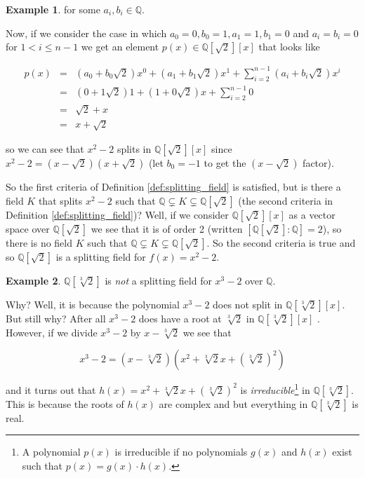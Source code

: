 \documentclass[11pt, oneside]{article}   	%
\theoremstyle{definition}
\newtheorem{example}{Example}[section]
\begin{document}
\begin{example}
\bigskip
\noindent
for some $a_i, b_i \in \mathbb{Q}$.

\bigskip
\noindent
Now, if we consider the case in which $a_0 = 0, b_0 = 1, a_1 = 1, b_1 = 0$ and 
$a_i = b_i = 0$ for $1 < i \leq n - 1$ we get an element $p(x) \in \mathbb{Q}[\sqrt{2}][x]$ 
that looks like

\begin{equation*}
\begin{array}{rlll} 
p(x)   
&=& (a_0 + b_0 \sqrt{2}) x^0 + (a_1 + b_1 \sqrt{2}) x^1 + \sum\limits_{i = 2}^{n-1} (a_i+ b_i \sqrt{2}) x^i    \\    
&=& (0 + 1 \sqrt{2}) 1 + (1 + 0 \sqrt{2}) x + \sum\limits_{i = 2}^{n-1} 0                                   \\    
&=&   \sqrt{2} + x                                                                                                                                      \\
&=&  x +  \sqrt{2}   
\end{array}
\end{equation*}

\bigskip
\noindent
so we can see that $x^2 - 2$ splits in $\mathbb{Q}[\sqrt{2}][x]$  since $x^2 -2 = (x - \sqrt{2})(x + \sqrt{2})$ (let $b_0 = -1$ to get the $(x - \sqrt{2})$ factor).

\bigskip
\noindent
So the first criteria of Definition \ref{def:splitting_field} is satisfied, but is there a field $K$ that splits $x^2 - 2$ such that 
$\mathbb{Q} \subsetneq  K \subsetneq \mathbb{Q}[\sqrt{2}]$ (the second criteria in Definition \ref{def:splitting_field})? Well, if we consider 
$\mathbb{Q}[\sqrt{2}][x]$ as a vector space over $\mathbb{Q}[\sqrt{2}]$ we see that it is of order 2 (written $[\mathbb{Q}[\sqrt{2}]: \mathbb{Q}] = 2$), 
so there is no field $K$ such that $\mathbb{Q} \subsetneq  K \subsetneq \mathbb{Q}[\sqrt{2}]$. So the second criteria is true and so  
$\mathbb{Q}[\sqrt{2}]$ is a splitting field for $f(x) = x^2 - 2$.
\end{example}



\begin{example}
$\mathbb{Q}[\sqrt[3]{2}]$ is \emph{not} a splitting field for $x^3 - 2$ over $\mathbb{Q}$. 

\bigskip
\noindent
Why? Well, it is because the polynomial $x^3 - 2$ does not split in $\mathbb{Q}[\sqrt[3]{2}][x]$. But still why? After all
$x^3 - 2$ does have a root at $\sqrt[3]{2}$ in $\mathbb{Q}[\sqrt[3]{2}] [x]$ . However,
if we divide $x^3 - 2$ by $x - \sqrt[3]{2}$ we see that

\begin{equation}
x^3 - 2 = (x - \sqrt[3]{2})(x^2 + \sqrt[3]{2} x + (\sqrt[3]{2})^2)
\label{eqn:x^3-2}
\end{equation}

\bigskip
\noindent
and it turns out that $h(x) = x^2 + \sqrt[3]{2} x + (\sqrt[3]{2})^2$ is \emph{irreducible}\footnote{A polynomial $p(x)$ is
irreducible if no polynomials $g(x)$ and $h(x)$ exist such that $p(x) = g(x) \cdot h(x)$.} in $\mathbb{Q}[\sqrt[3]{2}]$.
This is because the roots of $h(x)$ are complex and but everything in $\mathbb{Q}[\sqrt[3]{2}]$ is real.
\end{example}
\end{document}
